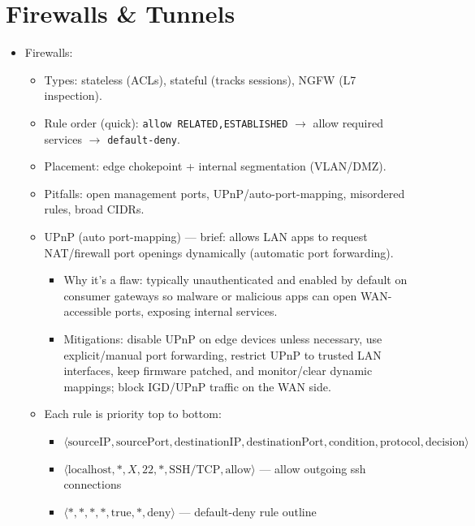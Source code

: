 \documentclass[12pt]{article}
\begin{document}
\section{Firewalls \& Tunnels}
\begin{itemize}
  \item Firewalls:
    \begin{itemize}
      \item Types: stateless (ACLs), stateful (tracks sessions), NGFW (L7 inspection).
      \item Rule order (quick): \texttt{allow RELATED,ESTABLISHED} $\to$ allow required services $\to$ \texttt{default-deny}.
      \item Placement: edge chokepoint + internal segmentation (VLAN/DMZ).
      \item Pitfalls: open management ports, UPnP/auto-port-mapping, misordered rules, broad CIDRs.
      \item UPnP (auto port-mapping) --- brief: allows LAN apps to request NAT/firewall port openings dynamically (automatic port forwarding).
        \begin{itemize}
          \item Why it's a flaw: typically unauthenticated and enabled by default on consumer gateways so malware or malicious apps can open WAN-accessible ports, exposing internal services.
          \item Mitigations: disable UPnP on edge devices unless necessary, use explicit/manual port forwarding, restrict UPnP to trusted LAN interfaces, keep firmware patched, and monitor/clear dynamic mappings; block IGD/UPnP traffic on the WAN side.
        \end{itemize}
      \item Each rule is priority top to bottom:
        \begin{itemize}
          \item $\langle\text{sourceIP}, \text{sourcePort}, \text{destinationIP}, \text{destinationPort}, \text{condition}, \text{protocol}, \text{decision}\rangle$
          \item $\langle\text{localhost}, *, X, 22, *, \text{SSH/TCP}, \text{allow}\rangle$ --- allow outgoing ssh connections
          \item $\langle*, *, *, *, \text{true}, *, \text{deny}\rangle$ --- default-deny rule outline

\end{itemize}
\end{itemize}
\end{itemize}
\end{document}
